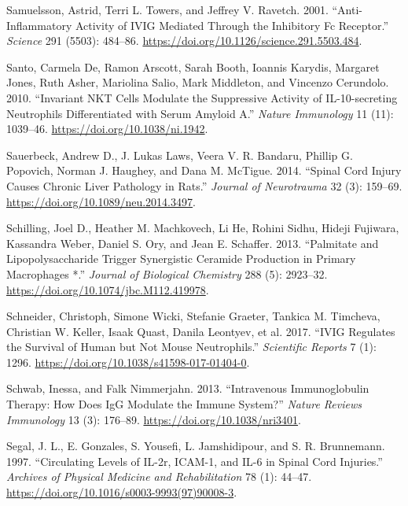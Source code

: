 \documentclass[9pt,lineno]{elife}
\newlength{\cslhangindent}
\newlength{\cslentryspacingunit} %
\newenvironment{CSLReferences}[2] %
 {%
  \setlength{\parindent}{0pt}
  \ifodd #1
  \let\oldpar\par
  \def\par{\hangindent=\cslhangindent\oldpar}
  \fi
  \setlength{\parskip}{#2\cslentryspacingunit}
 }%
 {}
\begin{document}
\begin{CSLReferences}{1}{0}
\leavevmode{}%
Samuelsson, Astrid, Terri L. Towers, and Jeffrey V. Ravetch. 2001. {``Anti-Inflammatory {Activity} of {IVIG Mediated Through} the {Inhibitory Fc Receptor}.''} \emph{Science} 291 (5503): 484--86. \url{https://doi.org/10.1126/science.291.5503.484}.

\leavevmode{}%
Santo, Carmela De, Ramon Arscott, Sarah Booth, Ioannis Karydis, Margaret Jones, Ruth Asher, Mariolina Salio, Mark Middleton, and Vincenzo Cerundolo. 2010. {``Invariant {NKT} Cells Modulate the Suppressive Activity of {IL-10-secreting} Neutrophils Differentiated with Serum Amyloid {A}.''} \emph{Nature Immunology} 11 (11): 1039--46. \url{https://doi.org/10.1038/ni.1942}.

\leavevmode{}%
Sauerbeck, Andrew D., J. Lukas Laws, Veera V. R. Bandaru, Phillip G. Popovich, Norman J. Haughey, and Dana M. McTigue. 2014. {``Spinal {Cord Injury Causes Chronic Liver Pathology} in {Rats}.''} \emph{Journal of Neurotrauma} 32 (3): 159--69. \url{https://doi.org/10.1089/neu.2014.3497}.

\leavevmode{}%
Schilling, Joel D., Heather M. Machkovech, Li He, Rohini Sidhu, Hideji Fujiwara, Kassandra Weber, Daniel S. Ory, and Jean E. Schaffer. 2013. {``Palmitate and {Lipopolysaccharide Trigger Synergistic Ceramide Production} in {Primary Macrophages} *.''} \emph{Journal of Biological Chemistry} 288 (5): 2923--32. \url{https://doi.org/10.1074/jbc.M112.419978}.

\leavevmode{}%
Schneider, Christoph, Simone Wicki, Stefanie Graeter, Tankica M. Timcheva, Christian W. Keller, Isaak Quast, Danila Leontyev, et al. 2017. {``{IVIG} Regulates the Survival of Human but Not Mouse Neutrophils.''} \emph{Scientific Reports} 7 (1): 1296. \url{https://doi.org/10.1038/s41598-017-01404-0}.

\leavevmode{}%
Schwab, Inessa, and Falk Nimmerjahn. 2013. {``Intravenous Immunoglobulin Therapy: How Does {IgG} Modulate the Immune System?''} \emph{Nature Reviews Immunology} 13 (3): 176--89. \url{https://doi.org/10.1038/nri3401}.

\leavevmode{}%
Segal, J. L., E. Gonzales, S. Yousefi, L. Jamshidipour, and S. R. Brunnemann. 1997. {``Circulating Levels of {IL-2r}, {ICAM-1}, and {IL-6} in Spinal Cord Injuries.''} \emph{Archives of Physical Medicine and Rehabilitation} 78 (1): 44--47. \url{https://doi.org/10.1016/s0003-9993(97)90008-3}.


\end{CSLReferences}
\end{document}
